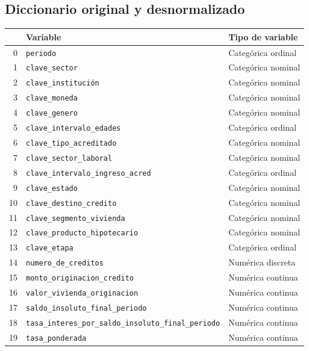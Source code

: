 \subsection{Diccionario original y desnormalizado}
\begin{table}[H]
	\centering
	\begin{tabular}{r p{9cm} l}
		\hline
		& \textbf{Variable} & \textbf{Tipo de variable} \\
		\hline
		0  & \texttt{periodo} & Categórica ordinal \\
		1  & \texttt{clave\_sector} & Categórica nominal \\
		2  & \texttt{clave\_institución} & Categórica nominal \\
		3  & \texttt{clave\_moneda} & Categórica nominal \\
		4  & \texttt{clave\_genero} & Categórica nominal \\
		5  & \texttt{clave\_intervalo\_edades} & Categórica ordinal \\
		6  & \texttt{clave\_tipo\_acreditado} & Categórica nominal \\
		7  & \texttt{clave\_sector\_laboral} & Categórica nominal \\
		8  & \texttt{clave\_intervalo\_ingreso\_acred} & Categórica ordinal \\
		9  & \texttt{clave\_estado} & Categórica nominal \\
		10 & \texttt{clave\_destino\_credito} & Categórica nominal \\
		11 & \texttt{clave\_segmento\_vivienda} & Categórica nominal \\
		12 & \texttt{clave\_producto\_hipotecario} & Categórica nominal \\
		13 & \texttt{clave\_etapa} & Categórica ordinal \\
		14 & \texttt{numero\_de\_creditos} & Numérica discreta \\
		15 & \texttt{monto\_originacion\_credito} & Numérica continua \\
		16 & \texttt{valor\_vivienda\_originacion} & Numérica continua \\
		17 & \texttt{saldo\_insoluto\_final\_periodo} & Numérica continua \\
		18 & \texttt{tasa\_interes\_por\_saldo\_insoluto\_final\_periodo} & Numérica continua \\
		19 & \texttt{tasa\_ponderada} & Numérica continua \\
		\hline
	\end{tabular}
\end{table}